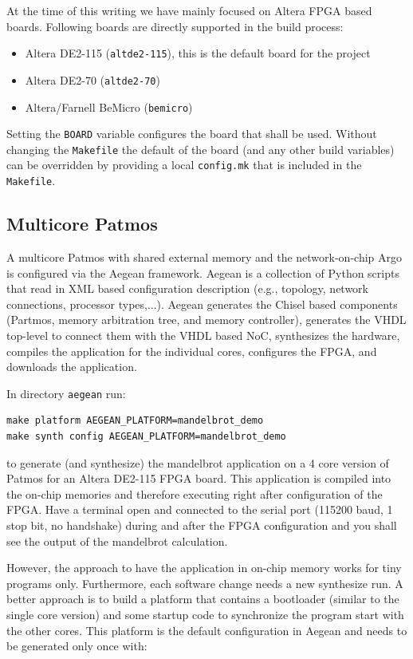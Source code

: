 \documentclass[a4paper,fontsize=10pt,twoside,DIV15,BCOR12mm,headinclude=true,footinclude=false,pagesize,bibtotoc]{scrbook}
\newcommand{\code}[1]{{\texttt{#1}}}
\begin{document}
At the time of this writing we have mainly focused on Altera FPGA based boards. Following boards
are directly supported in the build process:

\begin{itemize}
\item Altera DE2-115 (\code{altde2-115}), this is the default board for the project
\item Altera DE2-70 (\code{altde2-70})
\item Altera/Farnell BeMicro (\code{bemicro})
\end{itemize}

Setting the \code{BOARD} variable configures the board that shall be used.
Without changing the \code{Makefile} the default of the board (and any other build variables)
can be overridden by providing a local \code{config.mk} that is included in the \code{Makefile}.

\subsection{Multicore Patmos}

A multicore Patmos with shared external memory and the network-on-chip Argo is configured via
the Aegean framework. Aegean is a collection of Python scripts that read in XML based configuration
description (e.g., topology, network connections, processor types,...). Aegean generates the Chisel based
components (Partmos, memory arbitration tree, and memory controller), generates the VHDL top-level
to connect them with the VHDL based NoC, synthesizes the hardware, compiles the application for the
individual cores, configures the FPGA, and downloads the application.

In directory \code{aegean} run:

\begin{verbatim}
make platform AEGEAN_PLATFORM=mandelbrot_demo
make synth config AEGEAN_PLATFORM=mandelbrot_demo
\end{verbatim}

to generate (and synthesize) the mandelbrot application on a 4 core
version of Patmos for an Altera DE2-115 FPGA board. This application is compiled
into the on-chip memories and therefore executing right after configuration of the
FPGA. Have a terminal open and connected to the serial port (115200 baud, 1 stop bit,
no handshake) during and after the FPGA configuration and you shall see the output of
the mandelbrot calculation.

However, the approach to have the application in on-chip memory works for tiny programs
only. Furthermore, each software change needs a new synthesize run. A better approach is
to build a platform that contains a bootloader (similar to the single core version) and some
startup code to synchronize the program start with the other cores. This platform is the default
configuration in Aegean and needs to be generated only once with:
\end{document}
